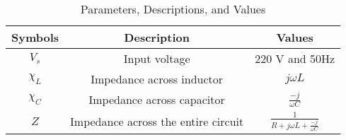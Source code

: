 \begin{table}[ht!]
\centering
\begin{tabular}{ |c|c|c| } 
 \hline
Symbols & Description & Values  \\
\hline
 $V_s$ & Input voltage & 220 V and 50Hz\\
 \hline
 $\chi_L$ & Impedance across inductor & $j\omega L$\\
 \hline
 $\chi_C$ & Impedance across capacitor & $\frac{-j}{\omega C}$\\
 \hline
 $Z$& Impedance across the entire circuit & $\frac{1}{R+j\omega L +\frac{-j}{\omega C}}$\\
 \hline
\end{tabular}
\caption{Parameters, Descriptions, and Values}
\label{table:ee25-analog}
\end{table}



